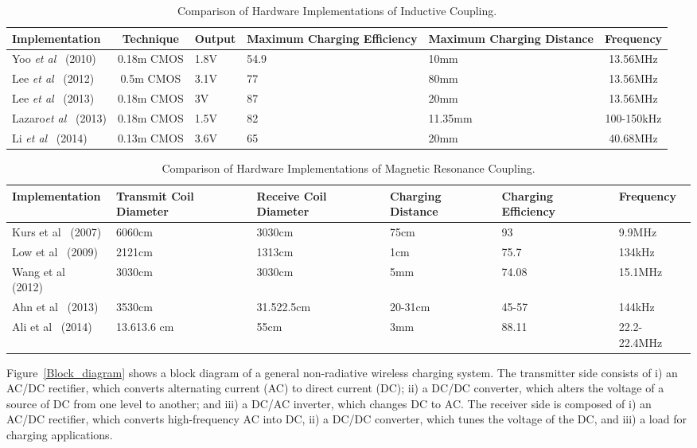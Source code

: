 \documentclass[twocolumn,10pt]{IEEEtran}
\begin{document}
\begin{table*} \small
\centering
\caption{\footnotesize Comparison of Hardware Implementations of Inductive Coupling.} \label{Hardware_comparison} 
\begin{tabular}{|l|c|p{2.6cm}|p{2.9cm}|p{2.9cm}|c| } 
\hline
\footnotesize Implementation &  Technique & Output &  Maximum Charging Efficiency  &  Maximum Charging Distance & Frequency \\   
\hline
Yoo {\em et al}~\cite{J.2010Yoo} (2010) &   0.18m CMOS & 1.8V & 54.9 & 10mm & 13.56MHz  \\
\hline
Lee {\em et al}~\cite{M.2012Lee} (2012) &   0.5m CMOS &  3.1V & 77 & 80mm & 13.56MHz    \\
\hline
Lee {\em et al}~\cite{Y.2013Lee} (2013) &   0.18m CMOS & 3V & 87 & 20mm & 13.56MHz    \\
\hline
Lazaro{\em et al}~\cite{O.2013Lazaro} (2013) &  0.18m CMOS & 1.5V & 82 & 11.35mm & 100-150kHz   \\
\hline 
Li {\em et al}~\cite{X.2015Li} (2014) &   0.13m CMOS & 3.6V & 65 &    20mm & 40.68MHz  \\
\hline
\end{tabular}
\end{table*} 

\begin{table*} \small
\centering
\caption{\footnotesize Comparison of Hardware Implementations of Magnetic Resonance Coupling.} \label{Hardware_RC}
\begin{tabular}{|l|p{2.1cm}|p{2.1cm}|l|l|l| } 
\hline
\footnotesize Implementation &  Transmit Coil Diameter & Receive Coil Diameter & Charging Distance  &  Charging Efficiency & Frequency \\
\hline
Kurs {et al}~\cite{Kurs2007A} (2007) & 6060cm  & 3030cm & 75cm & 93 & 9.9MHz\\
\hline
Low {et al}~\cite{N.2009Low} (2009) & 2121cm  & 1313cm & 1cm & 75.7 & 134kHz\\
\hline
Wang {et al}~\cite{D.2012Wang} (2012) &  3030cm  & 3030cm &  5mm & 74.08  & 15.1MHz \\
\hline
Ahn {et al}~\cite{D.2013Ahn} (2013) & 3530cm & 31.522.5cm & 20-31cm & 45-57  & 144kHz\\
\hline
Ali {et al}~\cite{T.2014Ali} (2014) & 13.613.6 cm & 55cm & 3mm & 88.11 & 22.2-22.4MHz \\
\hline
\end{tabular}
\end{table*} 

Figure~\ref{Block_diagram} shows a block diagram of a general non-radiative wireless charging system. The transmitter side consists of i) an AC/DC rectifier, which converts alternating current (AC) to direct current (DC); ii) a DC/DC converter, which alters the voltage of a source of DC from one level to another; and iii) a DC/AC inverter, which changes DC to AC. The receiver side is composed of i) an AC/DC rectifier, which converts high-frequency AC into DC, ii) a DC/DC converter, which tunes the voltage of the DC, and iii) a load for charging applications.
\end{document}
